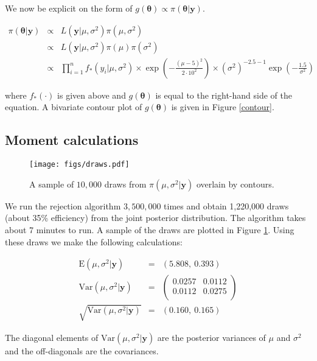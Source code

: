 \documentclass[12pt]{article}
\newcommand{\m}[1]{\mathbf{\bm{#1}}}
\begin{document}
\noindent We now be explicit on the form of $g(\m{\theta}) \propto \pi(\m{\theta}|\m{y})$.

\begin{eqnarray*}
\pi(\m{\theta}|\m{y}) &\propto& L(\m{y}|\mu, \sigma^2)\pi(\mu, \sigma^2) \\
&\propto& L(\m{y}|\mu, \sigma^2)\pi(\mu)\pi(\sigma^2) \\
&\propto& \prod_{i=1}^n f_*(y_i|\mu,\sigma^2)\times \exp\left(-\frac{(\mu-5)^2}{2\cdot10^2}\right) \times (\sigma^2)^{-2.5-1}\exp\left(-\frac{1.5}{\sigma^2}\right)
\end{eqnarray*}

\noindent where $f_*(\cdot)$ is given above and $g(\m{\theta})$ is equal to the right-hand side of the equation. A bivariate contour plot of $g(\m{\theta})$ is given in Figure \ref{contour}.

\subsection{Moment calculations}

\begin{figure}
    \begin{center}
    \texttt{[image: figs/draws.pdf]}
    \end{center}
    \caption{A sample of $10,000$ draws from $\pi(\mu,\sigma^2|\m{y})$ overlain by contours.}
    \label{draws}
\end{figure}

\noindent We run the rejection algorithm $3,500,000$ times and obtain 1,220,000 draws (about 35\% efficiency) from the joint posterior distribution. The algorithm takes about 7 minutes to run. A sample of the draws are plotted in Figure \ref{draws}. Using these draws we make the following calculations:

\begin{eqnarray*}
\mathrm{E}(\mu,\sigma^2|\m{y}) &=& (5.808,~0.393) \\
\mathrm{Var}(\mu, \sigma^2|\m{y}) &=& \left(\begin{array}{ll} 0.0257 & 0.0112 \\ 0.0112 & 0.0275 \\ \end{array}\right) \\
\sqrt{\mathrm{Var}(\mu, \sigma^2|\m{y})} &=& (0.160,~0.165)
\end{eqnarray*}

\noindent The diagonal elements of $\mathrm{Var}(\mu, \sigma^2|\m{y})$ are the posterior variances of $\mu$ and $\sigma^2$ and the off-diagonals are the covariances.
\end{document}

